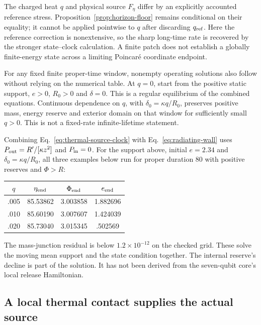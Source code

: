 The charged heat $q$ and physical source $F_\eta$ differ by an explicitly
accounted reference stress. Proposition~\ref{prop:horizon-floor} remains
conditional on their equality; it cannot be applied pointwise to $q$
after discarding $q_{\rm ref}$. Here the reference correction is
nonextensive, so the sharp long-time rate is recovered by the stronger
state--clock calculation. A finite patch does not establish a globally
finite-energy state across a limiting Poincar\'e coordinate endpoint.

For any fixed finite proper-time window, nonempty operating solutions
also follow without relying on the numerical table. At $q=0$, start
from the positive static support, $e>0$, $R_0>0$ and $\delta=0$.
This is a regular equilibrium of the combined equations. Continuous
dependence on $q$, with $\delta_0=\kappa q/R_0$, preserves positive
mass, energy reserve and exterior domain on that window for sufficiently
small $q>0$. This is not a fixed-rate infinite-lifetime statement.

Combining Eq.~\eqref{eq:thermal-source-clock} with
Eq.~\eqref{eq:radiating-wall} uses
$P_{\rm out}=R'/[\kappa z^2]$ and $P_{\rm in}=0$.
For the support above, initial $e=2.34$ and
$\delta_0=\kappa q/R_0$, all three examples below run for proper
duration 80 with positive reserves and $\Phi>R$:
\begin{center}
\begin{tabular}{cccc}
\hline
$q$ & $\eta_{\rm end}$ & $\Phi_{\rm end}$ & $e_{\rm end}$\\
\hline
.005 & 85.53862 & 3.003858 & 1.882696\\
.010 & 85.60190 & 3.007607 & 1.424039\\
.020 & 85.73040 & 3.015345 & .502569\\
\hline
\end{tabular}
\end{center}
The mass-junction residual is below $1.2\times10^{-12}$ on the checked
grid. These solve the moving mean support and the state condition together.
The internal reserve's decline is part of the solution. It has not been
derived from the seven-qubit core's local release Hamiltonian.

\subsection{A local thermal contact supplies the actual source}
\label{sec:local-source-contact}

